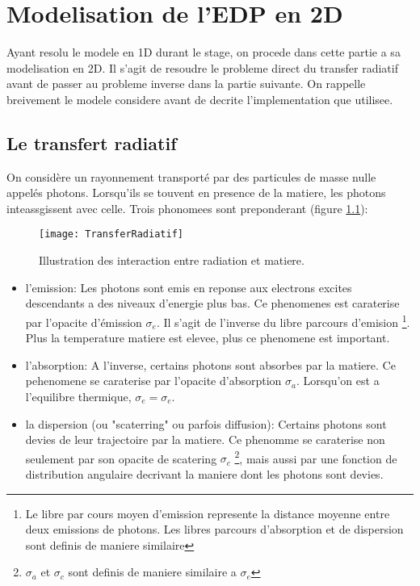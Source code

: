 
\chapter{Modelisation de l'EDP en 2D} %

\label{Chapter3} %


Ayant resolu le modele en 1D durant le stage, on procede dans cette partie a sa modelisation en 2D. Il s'agit de resoudre le probleme direct du transfer radiatif avant de passer au probleme inverse dans la partie suivante. On rappelle breivement le modele considere avant de decrite l'implementation que utilisee.

\section{Le transfert radiatif}


On considère un rayonnement transporté par des particules de masse nulle appelés photons. Lorsqu'ils se touvent en presence de la matiere, les photons inteassgissent avec celle. Trois phonomees sont preponderant (figure \ref{fig:TransferRadiatif}):

\begin{figure}[!h]
\centering
\texttt{[image: TransferRadiatif]} 
\decoRule
\caption[TransferRadiatif]{Illustration des interaction entre radiation et matiere.}
\label{fig:TransferRadiatif}
\end{figure}

\begin{itemize}
 \item l'emission: Les photons sont emis en reponse aux electrons excites descendants a des niveaux d'energie plus bas. Ce phenomenes est caraterise par l'opacite d'émission $\sigma_e$. Il s'agit de l'inverse du libre parcours d'emision \footnote{Le libre par cours moyen d'emission represente la distance moyenne entre deux emissions de photons. Les libres parcours d'absorption et de dispersion sont definis de maniere similaire}. Plus la temperature matiere est elevee, plus ce phenomene est important.
 \item l'absorption: A l'inverse, certains photons sont absorbes par la matiere. Ce pehenomene se caraterise par l'opacite d'absorption $\sigma_a$. Lorsqu'on est a l'equilibre thermique, $\sigma_e = \sigma_e$.
 \item la dispersion (ou "scaterring" ou parfois diffusion): Certains photons sont devies de leur trajectoire par la matiere. Ce phenomme se caraterise non seulement par son opacite de scatering $\sigma_c$ \footnote{ $\sigma_a$ et $\sigma_c$ sont definis de maniere similaire a $\sigma_e$}, mais aussi par une fonction de distribution angulaire decrivant la maniere dont les photons sont devies.
\end{itemize}

